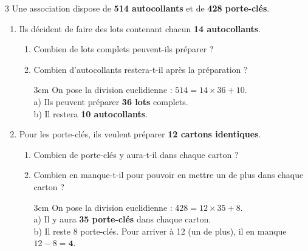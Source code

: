 \documentclass[a4paper]{book}
\begin{document}
{    \begin{exerciceNote}{3}
        Une association dispose de \textbf{514 autocollants} et de \textbf{428 porte-clés}.

        \begin{enumerate}[leftmargin=*]
            \item Ils décident de faire des lots contenant chacun \textbf{14 autocollants}.
            \begin{enumerate}[leftmargin=*]
                \item Combien de lots complets peuvent-ils préparer ?
                \item Combien d'autocollants restera-t-il après la préparation ?

                \begin{ZoneReponse}{3cm}
                    On pose la division euclidienne : $514 = 14 \times 36 + 10$.\\
                    a) Ils peuvent préparer \textbf{36 lots} complets.\\
                    b) Il restera \textbf{10 autocollants}.
                \end{ZoneReponse}
            \end{enumerate}
            \item Pour les porte-clés, ils veulent préparer \textbf{12 cartons identiques}.
            \begin{enumerate}[leftmargin=*]
                \item Combien de porte-clés y aura-t-il dans chaque carton ?
                \item Combien en manque-t-il pour pouvoir en mettre un de plus dans chaque carton ?

                \begin{ZoneReponse}{3cm}
                    On pose la division euclidienne : $428 = 12 \times 35 + 8$.\\
                    a) Il y aura \textbf{35 porte-clés} dans chaque carton.\\
                    b) Il reste 8 porte-clés. Pour arriver à 12 (un de plus), il en manque $12 - 8 = \mathbf{4}$.
                \end{ZoneReponse}
            \end{enumerate}
        \end{enumerate}
    \end{exerciceNote}
    

\newpage

}
\end{document}

